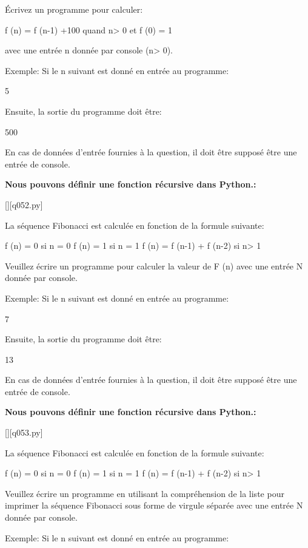 \question
Écrivez un programme pour calculer:

f (n) = f (n-1) +100 quand n> 0
et f (0) = 1

avec une entrée n donnée par console (n> 0).

Exemple:
Si le n suivant est donné en entrée au programme:

5

Ensuite, la sortie du programme doit être:

500

En cas de données d'entrée fournies à la question, il doit être supposé être une entrée de console.
\par
\textbf{Nous pouvons définir une fonction récursive dans Python.:}
\renewcommand{\nomfichier}{q052.py}
\begin{solution}
    \pythonfile{\chemincode \nomfichier}[][q052.py]
\end{solution}


\question
La séquence Fibonacci est calculée en fonction de la formule suivante:


f (n) = 0 si n = 0
f (n) = 1 si n = 1
f (n) = f (n-1) + f (n-2) si n> 1

Veuillez écrire un programme pour calculer la valeur de F (n) avec une entrée N donnée par console.

Exemple:
Si le n suivant est donné en entrée au programme:

7

Ensuite, la sortie du programme doit être:

13

En cas de données d'entrée fournies à la question, il doit être supposé être une entrée de console.
\par
\textbf{Nous pouvons définir une fonction récursive dans Python.:}
\renewcommand{\nomfichier}{q053.py}
\begin{solution}
    \pythonfile{\chemincode \nomfichier}[][q053.py]
\end{solution}


\question
La séquence Fibonacci est calculée en fonction de la formule suivante:


f (n) = 0 si n = 0
f (n) = 1 si n = 1
f (n) = f (n-1) + f (n-2) si n> 1

Veuillez écrire un programme en utilisant la compréhension de la liste pour imprimer la séquence Fibonacci sous forme de virgule séparée avec une entrée N donnée par console.

Exemple:
Si le n suivant est donné en entrée au programme:

